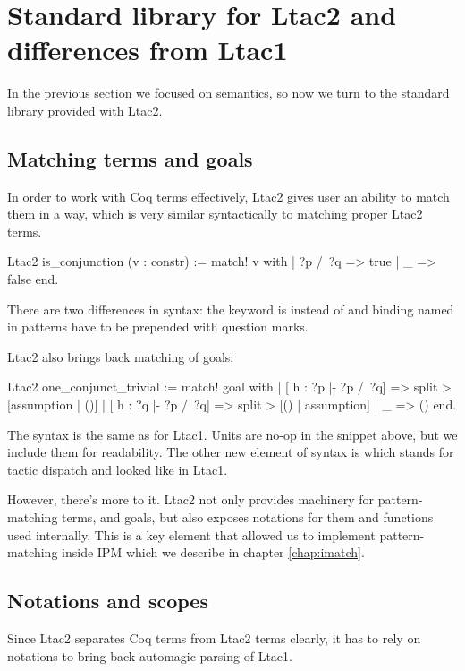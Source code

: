 \section{Standard library for Ltac2 and differences from Ltac1}

In the previous section we focused on semantics, so now we turn to the standard library provided with Ltac2.

\subsection{Matching terms and goals}
\label{sec:matching-terms}

In order to work with Coq terms effectively, Ltac2 gives user an ability to match them in a way, which is very similar syntactically to matching proper Ltac2 terms.
\begin{coq}
  Ltac2 is_conjunction (v : constr) :=
    match! v with
    | ?p /\ ?q => true
    | _ => false
    end.
\end{coq}
There are two differences in syntax: the keyword is  instead of  and binding named in patterns have to be prepended with question marks.

Ltac2 also brings back matching of goals:
\begin{coq}
Ltac2 one_conjunct_trivial :=
  match! goal with
  | [ h : ?p |- ?p /\ ?q] => split > [assumption | ()]
  | [ h : ?q |- ?p /\ ?q] => split > [() | assumption]
  | _ => ()
  end.
\end{coq}

The syntax is the same as for Ltac1. Units \coqe{()} are no-op in the snippet above, but we include them for readability.
The other new element of syntax is  which stands for tactic dispatch and looked like  in Ltac1.

However, there's more to it. Ltac2 not only provides machinery for pattern-matching terms, and goals, but also exposes notations for them and functions used internally.
This is a key element that allowed us to implement pattern-matching inside IPM which we describe in chapter \ref{chap:imatch}.

\subsection{Notations and scopes}
\label{subsec:ltac2-notations-scopes}

Since Ltac2 separates Coq terms from Ltac2 terms clearly, it has to rely on notations to bring back automagic parsing of Ltac1.

